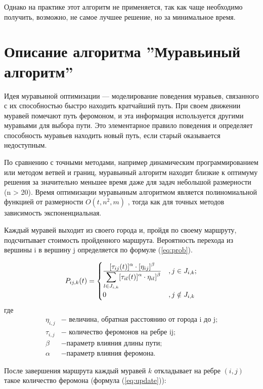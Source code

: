 Однако на практике этот  алгоритм не применяется, так как чаще необходимо получить, возможно, не самое лучшее решение, но за минимальное время.

\section{Описание алгоритма ''Муравьиный алгоритм''}
Идея муравьиной оптимизации --- моделирование поведения муравьев, связанного с их способностью быстро находить кратчайший путь. При своем движении муравей помечают путь феромоном, и эта информация используется другими муравьями для выбора пути. Это элементарное правило поведения и определяет способность муравьев находить новый путь, если старый оказывается недоступным. 

По сравнению с точными методами, например динамическим программированием или методом ветвей  и границ, муравьиный  алгоритм  находит близкие к оптимуму решения за значительно меньшее  время  даже  для  задач  небольшой  размерности (n > 20). Время оптимизации муравьиным алгоритмом является полиномиальной функцией от размерности $O(t, n^2, m)$ \cite{r1}, тогда  как для точных методов зависимость экспоненциальная.

Каждый муравей выходит из своего города и, пройдя по своему маршруту, подсчитывает стоимость пройденного маршрута. Вероятность перехода из вершины i в вершину j определяется по формуле (\ref{eq:prob}).

\begin{equation}
	\label{eq:prob}
	P_{i j, k} (t)= \begin{cases}
		\displaystyle[\tau_{ij}(t)]^\alpha \cdot [\eta_{ij}]^\beta\over 
		\displaystyle\sum\limits_{l \in J_{i, k }} [\tau_{il}(t)]^\alpha \cdot \eta_{il}]^\beta  &,  j \in J_{i, k};\\
		0 &,  j \notin J_{i, k}
	\end{cases}
\end{equation}
\noindent где
\begin{align*}
	\eta _{i,j} &- \text{ величина, обратная расстоянию от города i до j;} \\
	\tau _{i,j} &- \text{ количество феромонов на ребре ij;} \\
	\beta &- \text{параметр влияния длины пути;} \\
	\alpha &- \text{параметр влияния феромона.}
\end{align*}

После завершения маршрута каждый муравей $k$ откладывает на ребре $(i, j)$ такое  количество феромона (формула (\ref{eq:update})):

